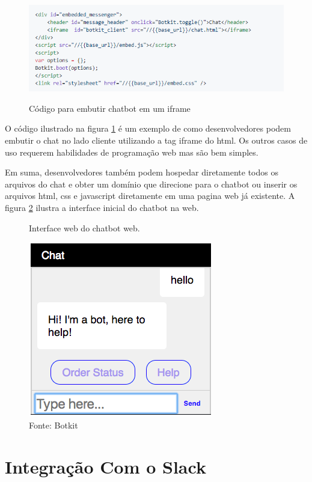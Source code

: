 \begin{figure}[H]
  \centering
   \caption{Código para embutir chatbot em um iframe}
  \includegraphics[scale=0.8]{Imagens/iframe.png} 
  \label{iframe}
\end{figure}

O código ilustrado na figura \ref{iframe} é um exemplo de como desenvolvedores podem embutir o chat no lado cliente utilizando a tag iframe do html. Os outros casos de uso requerem habilidades de programação web mas são bem simples.

Em suma, desenvolvedores também podem hospedar diretamente todos os arquivos do chat e obter um domínio que direcione para o chatbot ou inserir os arquivos html, css e javascript diretamente em uma pagina web já existente. A figura \ref{chatweb} ilustra a interface inicial do chatbot na web.


\begin{figure}[H]
  \caption{Interface web do chatbot web.}
  \centering
  
  \includegraphics[scale=0.8]{Imagens/chat-exemple.png} 
   \caption{Fonte: Botkit}
  \label{chatweb}
\end{figure}



\section{Integração Com o Slack}

